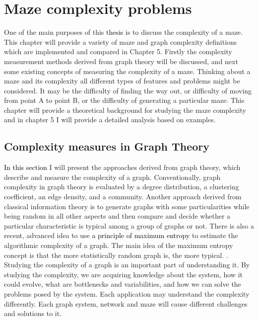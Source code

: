 \chapter{Maze complexity problems}\label{cha:background}
One of the main purposes of this \textcolor{black}{thesis} is to discuss the complexity of a maze. This chapter will provide a variety of maze and graph complexity definitions which are implemented and compared in Chapter 5. Firstly the complexity measurement methods derived from graph theory will be discussed, 
and next some existing concepts of measuring the complexity of a maze. Thinking about a maze and its complexity all different types of features and problems might be considered. 
It may be the difficulty of finding the way out, or difficulty of moving from point A to point B, or the difficulty of generating a particular maze. This chapter will provide a theoretical background for studying the maze complexity and in chapter 5 I will provide a detailed analysis based on examples. 
\section{Complexity measures in Graph Theory}
\textcolor{black}{In this section} I will present the approaches derived from graph theory, which describe and measure the complexity of a graph.
 Conventionally, graph complexity in graph theory is evaluated by a degree distribution, a clustering coefficient, an edge density, and a community. Another approach derived from classical information theory is to generate graphs with some particularities while being random in all other aspects and then compare and decide whether a particular characteristic is typical among a group of graphs or not.
There is also a recent, advanced idea to use \textcolor{black}{a principle of maximum entropy} to estimate the algorithmic complexity of a graph. The main idea of the maximum entropy concept is that the more statistically random graph is, the more typical. \cite{Zenil}. 
Studying the complexity of a graph is an important part of understanding it. By studying the complexity, we are acquiring knowledge about the system, how it could evolve, what are bottlenecks and variabilities, and how we can solve the problems posed by the system. Each application may understand the complexity differently. 
Each graph system, network and maze will cause different challenges and solutions to it. 
